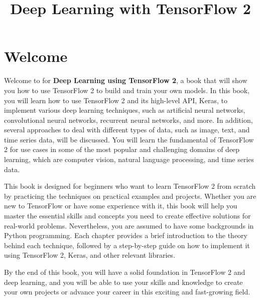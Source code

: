 \documentclass[
  letterpaper,
  DIV=11,
  numbers=noendperiod]{scrreprt}
\title{Deep Learning with TensorFlow 2}
\author{}
\date{}
\renewcommand*\contentsname{Table of contents}
\newcommand\contentsname{Table of contents}
\begin{document}
\maketitle
\ifdefined\Shaded\renewenvironment{Shaded}{\begin{tcolorbox}[borderline west={3pt}{0pt}{shadecolor}, boxrule=0pt, breakable, frame hidden, interior hidden, sharp corners, enhanced]}{\end{tcolorbox}}\fi

\renewcommand*\contentsname{Table of contents}
{
\hypersetup{linkcolor=}
\setcounter{tocdepth}{2}
\tableofcontents
}

\hypertarget{welcome}{%
\chapter*{Welcome}\label{welcome}}


Welcome to for \textbf{Deep Learning using TensorFlow 2}, a book that
will show you how to use TensorFlow 2 to build and train your own
models. In this book, you will learn how to use TensorFlow 2 and its
high-level API, Keras, to implement various deep learning techniques,
such as artificial neural networks, convolutional neural networks,
recurrent neural networks, and more. In addition, several approaches to
deal with different types of data, such as image, text, and time series
data, will be discussed. You will learn the fundamental of TensorFlow 2
for use cases in some of the most popular and challenging domains of
deep learning, which are computer vision, natural language processing,
and time series data.

This book is designed for beginners who want to learn TensorFlow 2 from
scratch by practicing the techniques on practical examples and projects.
Whether you are new to TensorFlow or have some experience with it, this
book will help you master the essential skills and concepts you need to
create effective solutions for real-world problems. Nevertheless, you
are assumed to have some backgrounds in Python programming. Each chapter
provides a brief introduction to the theory behind each technique,
followed by a step-by-step guide on how to implement it using TensorFlow
2, Keras, and other relevant libraries.

By the end of this book, you will have a solid foundation in TensorFlow
2 and deep learning, and you will be able to use your skills and
knowledge to create your own projects or advance your career in this
exciting and fast-growing field.
\end{document}
